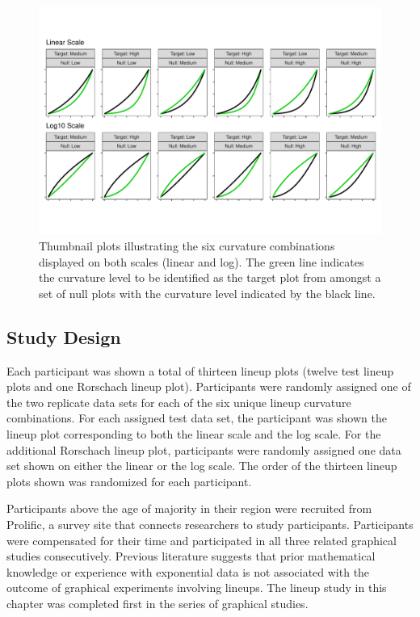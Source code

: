 \documentclass[12pt]{article}
\begin{document}
\begin{figure}[tbp]

{\centering \includegraphics[width=1\linewidth,]{logarithmic-lineups_files/figure-latex/curvature-combination-example-1} 

}

\caption[Lineup curvature combinations]{Thumbnail plots illustrating the six curvature combinations displayed on both scales (linear and log). The green line indicates the curvature level to be identified as the target plot from amongst a set of null plots with the curvature level indicated by the black line.}\label{fig:curvature-combination-example}
\end{figure}

\hypertarget{study-design}{%
\subsection{Study Design}\label{study-design}}

Each participant was shown a total of thirteen lineup plots (twelve test
lineup plots and one Rorschach lineup plot). Participants were randomly
assigned one of the two replicate data sets for each of the six unique
lineup curvature combinations. For each assigned test data set, the
participant was shown the lineup plot corresponding to both the linear
scale and the log scale. For the additional Rorschach lineup plot,
participants were randomly assigned one data set shown on either the
linear or the log scale. The order of the thirteen lineup plots shown
was randomized for each participant.

Participants above the age of majority in their region were recruited
from Prolific, a survey site that connects researchers to study
participants. Participants were compensated for their time and
participated in all three related graphical studies consecutively.
Previous literature suggests that prior mathematical knowledge or
experience with exponential data is not associated with the outcome of
graphical experiments involving lineups\citep{vanderplas2015spatial}.
The lineup study in this chapter was completed first in the series of
graphical studies.
\end{document}
